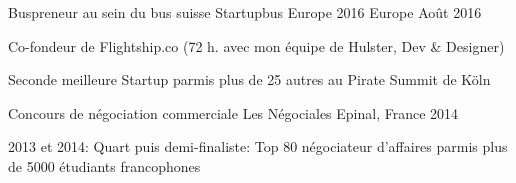 

\begin{cventries}

  \cventry
    {Buspreneur au sein du bus suisse} %
    {Startupbus Europe 2016} %
    {Europe} %
    {Août 2016} %
    {
      \begin{cvitems} %
        \item {Co-fondeur de Flightship.co (72 h. avec mon équipe de Hulster, Dev \& Designer)}
        \item {Seconde meilleure Startup parmis plus de 25 autres au Pirate Summit de Köln}
      \end{cvitems}
    }

  \cventry
    {Concours de négociation commerciale} %
    {Les Négociales} %
    {Epinal, France} %
    {2014} %
    {
    	\begin{cvitems}
    	\item{2013 et 2014: Quart puis demi-finaliste: Top 80 négociateur d'affaires parmis plus de 5000 étudiants francophones}
    	\end{cvitems}
    }
\end{cventries}

